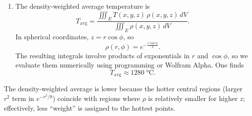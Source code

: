 \begin{example}
\begin{solution}
\begin{enumerate}
   \item The density-weighted average temperature is
   \[
   T_{\mathrm{avg}} 
   = \frac{\iiint_E T(x,y,z)\,\rho(x,y,z)\,dV}
          {\iiint_E \rho(x,y,z)\,dV}.
   \]
   In spherical coordinates, $z = r\cos\phi$, so
   \[
   \rho(r,\phi) = e^{-\tfrac{r\cos\phi}{3}}.
   \]
   The resulting integrals involve products of exponentials in $r$ and $\cos\phi$, so we evaluate them numerically using programming or Wolfram Alpha. One finds
   \[
   T_{\mathrm{avg}} \approx 1280\;\text{°C}.
   \]
\end{enumerate}
\vspace{0.5em}
\noindent
The density-weighted average is lower because the hotter central regions (larger $r^2$ term in $e^{-r^2/9}$) coincide with regions where $\rho$ is relatively smaller for higher $z$; effectively, less ``weight” is assigned to the hottest points.
\end{solution}
\end{example}
\exampleline



\newpage

\formsdefs{}

